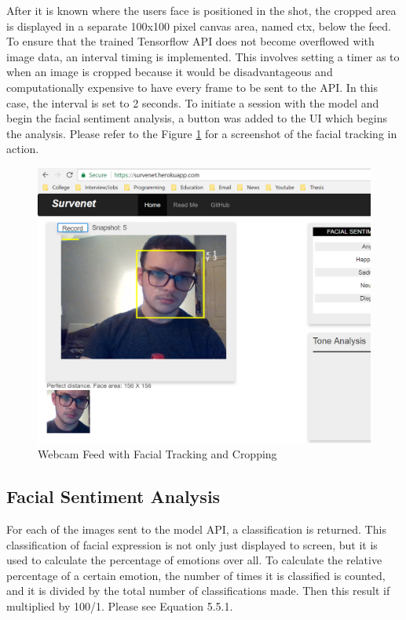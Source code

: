 After it is known where the users face is positioned in the shot, the cropped area is displayed in a separate 100x100 pixel canvas area, named ctx, below the feed. To ensure that the trained Tensorflow API does not become overflowed with image data, an interval timing is implemented. This involves setting a timer as to when an image is cropped because it would be disadvantageous and computationally expensive to have every frame to be sent to the API. In this case, the interval is set to 2 seconds. To initiate a session with the model and begin the facial sentiment analysis, a button was added to the UI which begins the analysis. Please refer to the Figure \ref{web} for a screenshot of the facial tracking in action.

\begin{figure}[ht]
	\begin{center}
		\advance\leftskip-3cm
		\advance\rightskip-3cm
		\includegraphics[keepaspectratio=true,scale=0.5]{__resources/implementation/webapp1.png}
		\caption{Webcam Feed with Facial Tracking and Cropping}
		\label{web}
	\end{center}
\end{figure}

\newpage

\subsection{Facial Sentiment Analysis} 

For each of the images sent to the model API, a classification is returned. This classification of facial expression is not only just displayed to screen, but it is used to calculate the percentage of emotions over all. To calculate the relative percentage of a certain emotion, the number of times it is classified is counted, and it is divided by the total number of classifications made. Then this result if multiplied by 100/1. Please see Equation 5.5.1.

